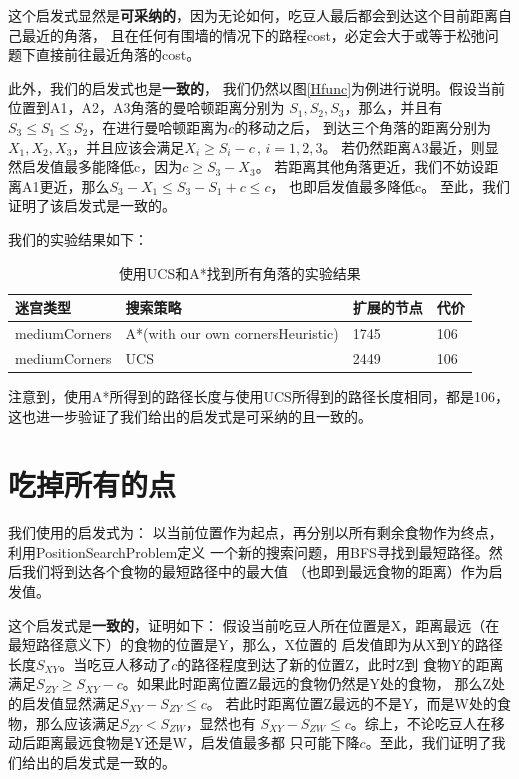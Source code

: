 \documentclass{article}
\begin{document}
这个启发式显然是\textbf{可采纳的}，因为无论如何，吃豆人最后都会到达这个目前距离自己最近的角落，
且在任何有围墙的情况下的路程cost，必定会大于或等于松弛问题下直接前往最近角落的cost。

此外，我们的启发式也是\textbf{一致的}，
我们仍然以图\ref{Hfunc}为例进行说明。假设当前位置到A1，A2，A3角落的曼哈顿距离分别为
$S_1,S_2,S_3$，那么，并且有$S_3 \le S_1 \le S_2$，在进行曼哈顿距离为$c$的移动之后，
到达三个角落的距离分别为$X_1,X_2,X_3$，并且应该会满足$X_i \ge S_i-c\, ,\, i=1,2,3$。
若仍然距离A3最近，则显然启发值最多能降低c，因为$c \ge S_3-X_3$。
若距离其他角落更近，我们不妨设距离A1更近，那么$S_3-X_1 \le S_3-S_1+c \le c$，
也即启发值最多降低c。
至此，我们证明了该启发式是一致的。


我们的实验结果如下：

\begin{table}[H]
	\centering
	\caption{使用UCS和A*找到所有角落的实验结果}
	\begin{tabular}{llll}
		\hline
	迷宫类型          & 搜索策略                              & 扩展的节点 & 代价  \\ \hline
	mediumCorners &  A*(with our own cornersHeuristic)    & 1745  & 106 \\
	mediumCorners & UCS & 2449  & 106 \\ \hline
	\end{tabular}
	\end{table}


注意到，使用A*所得到的路径长度与使用UCS所得到的路径长度相同，都是106，
这也进一步验证了我们给出的启发式是可采纳的且一致的。

\section{吃掉所有的点}
我们使用的启发式为：
以当前位置作为起点，再分别以所有剩余食物作为终点，利用PositionSearchProblem定义
一个新的搜索问题，用BFS寻找到最短路径。然后我们将到达各个食物的最短路径中的最大值
（也即到最远食物的距离）作为启发值。

这个启发式是\textbf{一致的}，证明如下：
假设当前吃豆人所在位置是X，距离最远（在最短路径意义下）的食物的位置是Y，那么，X位置的
启发值即为从X到Y的路径长度$S_{XY}$。当吃豆人移动了$c$的路径程度到达了新的位置Z，此时Z到
食物Y的距离满足$S_{ZY} \ge S_{XY} - c$。如果此时距离位置Z最远的食物仍然是Y处的食物，
那么Z处的启发值显然满足$  S_{XY} - S_{ZY} \le c$。
若此时距离位置Z最远的不是Y，而是W处的食物，那么应该满足$S_{ZY} < S_{ZW}$，显然也有
$  S_{XY} - S_{ZW} \le c$。综上，不论吃豆人在移动后距离最远食物是Y还是W，启发值最多都
只可能下降$c$。至此，我们证明了我们给出的启发式是一致的。
\end{document}
